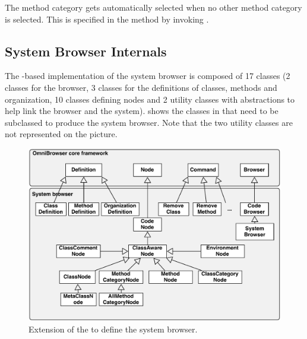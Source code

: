 \documentclass[a4paper,10pt,twoside]{book}
\begin{document}
The  method category gets automatically selected when no other method category is selected. This is specified in the  method by invoking .

\subsection{System Browser Internals}
The \ob-based implementation of the \pharo system browser is composed of 17 classes (2 classes for the browser, 3 classes for the definitions of classes, methods and organization, 10 classes defining nodes and 2 utility classes with abstractions to help link the browser and the system).  shows the classes in \obf that need to be subclassed to produce the system browser. Note that the two utility classes are not represented on the picture.





\begin{figure}[!ht]
\begin{center}
\includegraphics[width=\textwidth]{obInternal}
\caption{Extension of the \obf to define the system browser.} 
\end{center}
\end{figure}
\end{document}
